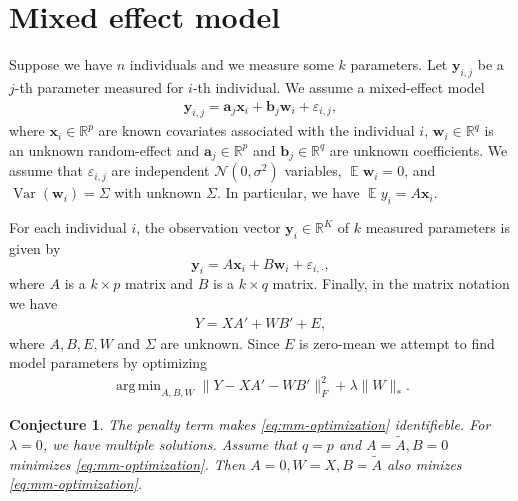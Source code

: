 \documentclass[preprint]{imsart}
\numberwithin{equation}{section}
\theoremstyle{plain}
\newcommand{\cN}{\mathcal{N}}
\newcommand{\R}{\mathbb{R}}
\newcommand{\by}{\mathbf{y}}
\newcommand{\bb}{\mathbf{b}}
\newcommand{\bx}{\mathbf{x}}
\newcommand{\bw}{\mathbf{w}}
\newcommand{\bb}{\mathbf{b}}
\newcommand{\ba}{\mathbf{a}}
\DeclareMathOperator*{\argmin}{arg\,min}
\DeclareMathOperator*{\Var}{Var}
\DeclareMathOperator*{\E}{\mathbb{E}}
\newtheorem{observation}{Observation}
\newtheorem{conjecture}{Conjecture}
\begin{document}
\section{Mixed effect model}
Suppose we have $n$ individuals and we measure some $k$ parameters. Let $\by_{i,j}$ be a $j$-th parameter measured for $i$-th individual. We assume a mixed-effect model
\begin{align}\label{eq:mm}
\by_{i,j} = \ba_j\bx_{i} + \bb_j\bw_i + \varepsilon_{i,j},
\end{align}
where $\bx_{i} \in \R^p$ are known covariates associated with the individual $i$, $\bw_{i} \in \R^q$ is an unknown random-effect and $\ba_j \in \R^p$ and $\bb_j \in \R^q$ are unknown coefficients. We assume that $\varepsilon_{i,j}$ are independent $\cN(0,\sigma^2)$ variables, $\E \bw_i = 0$, and $\Var(\bw_i) = \Sigma$ with unknown $\Sigma$. In particular, we have $\E y_i = A \bx_i $.

For each individual $i$, the observation vector $\by_{i} \in \R^K$ of $k$ measured parameters is given by
\[
\by_{i} = A\bx_{i} + B\bw_i + \varepsilon_{i,\cdot},
\]
where $A$ is a $k \times p$ matrix and $B$ is a $k \times q$ matrix. Finally, in the matrix notation we have
\begin{align}\label{eq:matrix}
Y = XA' + WB' + E,
\end{align}
where $A,B,E,W$ and $\Sigma$ are unknown. Since $E$ is zero-mean we attempt to find model parameters by optimizing
\begin{align}\label{eq:mm-optimization}
\argmin_{A,B,W} \|Y - XA' - WB'\|^2_F + \lambda\|W\|_*.
\end{align}

\begin{conjecture}
The penalty term makes \eqref{eq:mm-optimization} identifieble. For $\lambda = 0$, we have multiple solutions. Assume that $q=p$ and $A = \tilde{A}, B = 0$ minimizes \eqref{eq:mm-optimization}. Then $A = 0, W = X, B = \tilde{A}$ also minizes \eqref{eq:mm-optimization}.
\end{conjecture}

\end{document}

